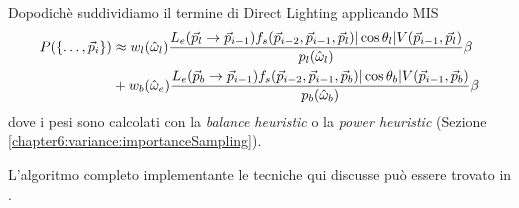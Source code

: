 Dopodich\`e suddividiamo il termine di Direct Lighting applicando MIS
\begin{align}
	P(\{\ldots,\vec{p}_{i}\})&\approx w_l(\hat{\omega}_l)\frac{L_e(\vec{p}_l\to\vec{p}_{i-1})f_s(\vec{p}_{i-2},\vec{p}_{i-1},\vec{p}_l)
		|\cos\theta_l|V(\vec{p}_{i-1},\vec{p}_l)}{p_l(\hat{\omega}_l)}\beta \nonumber \\
	&+w_b(\hat{\omega}_e)\frac{L_e(\vec{p}_b\to\vec{p}_{i-1})f_s(\vec{p}_{i-2},\vec{p}_{i-1},\vec{p}_b)
		|\cos\theta_b|V(\vec{p}_{i-1},\vec{p}_b)}{p_b(\hat{\omega}_b)}\beta
\end{align}
dove i pesi sono calcolati con la \textit{balance heuristic} o la \textit{power heuristic} (Sezione \ref{chapter6:variance:importanceSampling}).\par
L'algoritmo completo implementante le tecniche qui discusse pu\`o essere trovato in \cite{pharr}.
